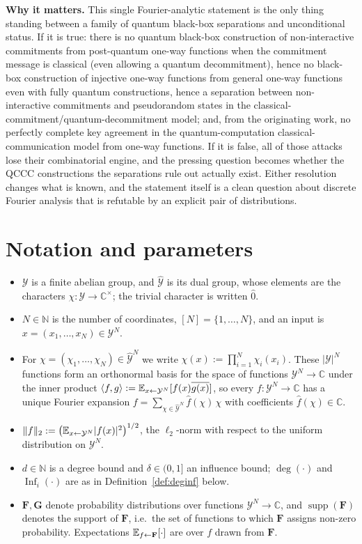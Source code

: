 \documentclass{aicr-conjecture}
\newcommand{\NN}{\mathbb{N}}
\newcommand{\CC}{\mathbb{C}}
\newcommand{\cY}{\mathcal{Y}}
\newcommand{\dY}{\widehat{\mathcal{Y}}}
\newcommand{\bF}{\mathbf{F}}
\newcommand{\bG}{\mathbf{G}}
\begin{document}
\textbf{Why it matters.} This single Fourier-analytic statement is the
only thing standing between a family of quantum black-box separations and
unconditional status. If it is true: there is no quantum black-box
construction of non-interactive commitments from post-quantum one-way
functions when the commitment message is classical (even allowing a
quantum decommitment), hence no black-box construction of injective
one-way functions from general one-way functions even with fully quantum
constructions, hence a separation between non-interactive commitments and
pseudorandom states in the classical-commitment/quantum-decommitment
model; and, from the originating work, no perfectly complete key
agreement in the quantum-computation classical-communication model from
one-way functions. If it is false, all of those attacks lose their
combinatorial engine, and the pressing question becomes whether the QCCC
constructions the separations rule out actually exist. Either resolution
changes what is known, and the statement itself is a clean question about
discrete Fourier analysis that is refutable by an explicit pair of
distributions.

\section{Notation and parameters}\label{sec:notation}

\begin{itemize}
  \item $\cY$ is a finite abelian group, and $\dY$ is its dual group,
  whose elements are the characters $\chi\colon\cY\to\CC^{\times}$; the
  trivial character is written $\hat{0}$.
  \item $N\in\NN$ is the number of coordinates, $[N]=\{1,\dots,N\}$, and
  an input is $x=(x_1,\dots,x_N)\in\cY^N$.
  \item For $\chi=(\chi_1,\dots,\chi_N)\in\dY^N$ we write
  $\chi(x):=\prod_{i=1}^{N}\chi_i(x_i)$. These $|\cY|^N$ functions form
  an orthonormal basis for the space of functions $\cY^N\to\CC$ under the
  inner product
  $\langle f,g\rangle:=\mathbb{E}_{x\sample\cY^N}[f(x)\overline{g(x)}]$,
  so every $f\colon\cY^N\to\CC$ has a unique Fourier expansion
  $f=\sum_{\chi\in\dY^N}\hat{f}(\chi)\,\chi$ with coefficients
  $\hat{f}(\chi)\in\CC$.
  \item $\lVert f\rVert_2 :=
  \bigl(\mathbb{E}_{x\sample\cY^N}\lvert f(x)\rvert^2\bigr)^{1/2}$, the
  $\ell_2$-norm with respect to the uniform distribution on $\cY^N$.
  \item $d\in\NN$ is a degree bound and $\delta\in(0,1]$ an influence
  bound; $\deg(\cdot)$ and $\operatorname{Inf}_i(\cdot)$ are as in
  Definition~\ref{def:deginf} below.
  \item $\bF,\bG$ denote probability distributions over functions
  $\cY^N\to\CC$, and $\operatorname{supp}(\bF)$ denotes the support of
  $\bF$, i.e.\ the set of functions to which $\bF$ assigns non-zero
  probability. Expectations $\mathbb{E}_{f\sample\bF}[\cdot]$ are over
  $f$ drawn from $\bF$.
\end{itemize}
\end{document}
